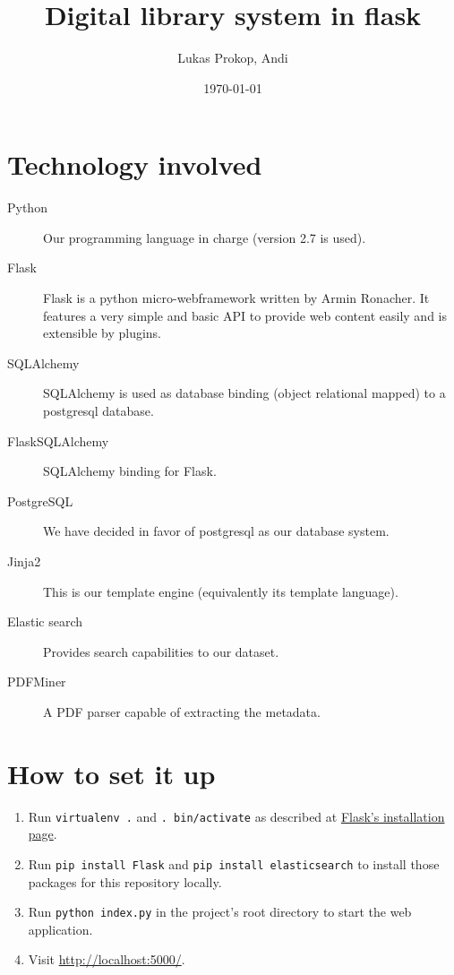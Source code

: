 \documentclass{article}
\author{
    Lukas Prokop,
    Andi
}
\title{Digital library system in flask}
\date{\today}
\begin{document}
\maketitle
\tableofcontents

\section{Technology involved}
%
\begin{description}
  \item[Python]
    Our programming language in charge (version 2.7 is used).
  \item[Flask]
    Flask is a python micro-webframework written by Armin Ronacher.
    It features a very simple and basic API to provide web content easily
    and is extensible by plugins.
  \item[SQLAlchemy]
    SQLAlchemy is used as database binding (object relational mapped)
    to a postgresql database.
  \item[FlaskSQLAlchemy]
    SQLAlchemy binding for Flask.
  \item[PostgreSQL]
    We have decided in favor of postgresql as our database system.
  \item[Jinja2]
    This is our template engine (equivalently its template language).
  \item[Elastic search]
    Provides search capabilities to our dataset.
  \item[PDFMiner]
    A PDF parser capable of extracting the metadata.
\end{description}

\section{How to set it up}
%
\begin{enumerate}
  \item Run \texttt{virtualenv .} and \texttt{. bin/activate}
        as described at \href{http://flask.pocoo.org/docs/installation/#installation}%
        {Flask's installation page}.
  \item Run \texttt{pip install Flask} and \texttt{pip install elasticsearch}
        to install those packages for this repository locally.
  \item Run \texttt{python index.py} in the project's root directory to start the web application.
  \item Visit \url{http://localhost:5000/}.
\end{enumerate}
\end{document}
